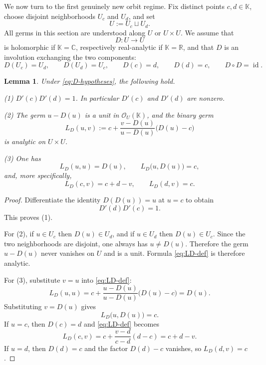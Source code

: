 \documentclass[11pt]{amsart}
\numberwithin{equation}{section}
\newtheorem{lemma}[theorem]{Lemma}
\theoremstyle{remark}
\theoremstyle{definition}
\newcommand{\C}{\mathbb{C}}
\newcommand{\R}{\mathbb{R}}
\newcommand{\K}{\mathbb{K}}
\newcommand{\Oc}{\mathcal{O}}
\newcommand{\id}{\operatorname{id}}
\begin{document}
We now turn to the first genuinely new orbit regime. Fix distinct points $c,d\in\K$, choose disjoint neighborhoods $U_c$ and $U_d$, and set
\[
U:=U_c\sqcup U_d.
\]
All germs in this section are understood along $U$ or $U\times U$. We assume that
\[
D\colon U\to U
\]
is holomorphic if $\K=\C$, respectively real-analytic if $\K=\R$, and that $D$ is an involution exchanging the two components:
\begin{equation}\label{eq:D-hypotheses}
D(U_c)=U_d,\qquad D(U_d)=U_c,\qquad D(c)=d,\qquad D(d)=c,\qquad D\circ D=\id.
\end{equation}

\begin{lemma}\label{lem:D-basic}
Under \eqref{eq:D-hypotheses}, the following hold.

\smallskip
\noindent (1) $D'(c)D'(d)=1$. In particular $D'(c)$ and $D'(d)$ are nonzero.

\smallskip
\noindent (2) The germ $u-D(u)$ is a unit in $\Oc_U(\K)$, and the binary germ
\begin{equation}\label{eq:LD-def}
L_D(u,v):=c+\frac{v-D(u)}{u-D(u)}\bigl(D(u)-c\bigr)
\end{equation}
is analytic on $U\times U$.

\smallskip
\noindent (3) One has
\begin{equation}\label{eq:LD-identities}
L_D(u,u)=D(u),\qquad L_D\bigl(u,D(u)\bigr)=c,
\end{equation}
and, more specifically,
\begin{equation}\label{eq:LD-slices}
L_D(c,v)=c+d-v,\qquad L_D(d,v)=c.
\end{equation}
\end{lemma}

\begin{proof}
Differentiate the identity $D(D(u))=u$ at $u=c$ to obtain
\[
D'(d)D'(c)=1.
\]
This proves (1).

For (2), if $u\in U_c$ then $D(u)\in U_d$, and if $u\in U_d$ then $D(u)\in U_c$. Since the two neighborhoods are disjoint, one always has $u\neq D(u)$. Therefore the germ $u-D(u)$ never vanishes on $U$ and is a unit. Formula \eqref{eq:LD-def} is therefore analytic.

For (3), substitute $v=u$ into \eqref{eq:LD-def}:
\[
L_D(u,u)=c+\frac{u-D(u)}{u-D(u)}\bigl(D(u)-c\bigr)=D(u).
\]
Substituting $v=D(u)$ gives
\[
L_D\bigl(u,D(u)\bigr)=c.
\]
If $u=c$, then $D(c)=d$ and \eqref{eq:LD-def} becomes
\[
L_D(c,v)=c+\frac{v-d}{c-d}(d-c)=c+d-v.
\]
If $u=d$, then $D(d)=c$ and the factor $D(d)-c$ vanishes, so $L_D(d,v)=c$.
\end{proof}
\end{document}
